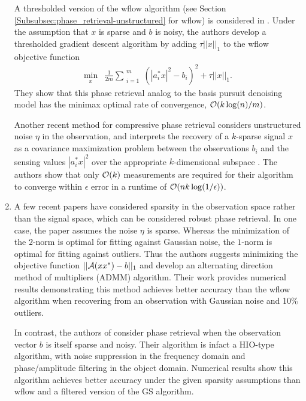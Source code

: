 \begin{enumerate}
A thresholded version of the wflow algorithm (see Section \ref{Subsubsec:phase_retrieval-unstructured} for wflow) is considered in \cite{cai2016optimal}.  Under the assumption that $x$ is sparse and $b$ is noisy, the authors develop a thresholded gradient descent algorithm by adding $\tau ||x||_1$ to the wflow objective function
\begin{equation}
\begin{array}{ll}
	\min\limits_{\substack{x}}
		&	\frac{1}{2m} \sum\limits_{\substack{i=1}}^{\substack{m}} \left( |a_i^*x|^2 - b_i \right)^2
			+ \tau ||x||_1.
\end{array}
\end{equation}
They show that this phase retrieval analog to the basis pursuit denoising model \cite{chen2001atomic} has the minimax optimal rate of convergence, ${\mathcal O} (k \log(n) / m)$.

Another recent method for compressive phase retrieval considers unstructured noise $\eta$ in the observation, and interprets the recovery of a $k$-sparse signal $x$ as a covariance maximization problem between the observations $b_i$ and the sensing values $|a_i^*x|^2$ over the appropriate $k$-dimensional subspace \cite{zhang2017fast}.  The authors show that only ${\mathcal O}(k)$ measurements are required for their algorithm to converge within $\epsilon$ error in a runtime of ${\mathcal O}(nk \log(1/ \epsilon))$.



\item

A few recent papers have considered sparsity in the observation space rather than the signal space, which can be considered robust phase retrieval.  In one case, the paper \cite{jiang2017robust} assumes the noise $\eta$ is sparse.  Whereas the minimization of the $2$-norm is optimal for fitting against Gaussian noise, the $1$-norm is optimal for fitting against outliers.  Thus the authors suggests minimizing the objective function $||{\mathcal A}(xx^*) - b||_1$ and develop an alternating direction method of multipliers (ADMM) algorithm.  Their work provides numerical results demonstrating this method achieves better accuracy than the wflow algorithm when recovering from an observation with Gaussian noise and 10\% outliers.

In contrast, the authors of \cite{katkovnik2017phase} consider phase retrieval when the observation vector $b$ is itself sparse and noisy.  Their algorithm is infact a HIO-type algorithm, with noise suppression in the frequency domain and phase/amplitude filtering in the object domain.  Numerical results show this algorithm achieves better accuracy under the given sparsity assumptions than wflow and a filtered version of the GS algorithm.




\end{enumerate}
